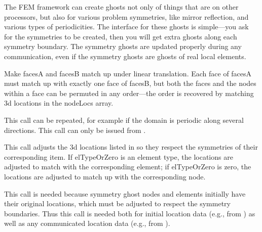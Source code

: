 \documentclass[10pt]{article}
\begin{document}
The FEM framework can create ghosts not only of things that are on other 
processors, but also for various problem symmetries, like mirror reflection,
and various types of periodicities.  The interface for these ghosts is 
simple---you ask for the symmetries to be created, then you will get 
extra ghosts along each symmetry boundary.  The symmetry ghosts are
updated properly during any communication, even if the symmetry ghosts
are ghosts of real local elements.



Make facesA and facesB match up under linear translation.
Each face of facesA must match up with exactly one face of
facesB, but both the faces and the nodes within a face can be
permuted in any order---the order is recovered by matching 3d locations
in the nodeLocs array.

This call can be repeated, for example if the domain is periodic along several
directions.  This call can only be issued from .




This call adjusts the 3d locations listed in  so they respect the symmetries
of their corresponding item.  If elTypeOrZero is an element type,
the locations are adjusted to match with the corresponding element;
if elTypeOrZero is zero, the locations are adjusted to match up with
the corresponding node.

This call is needed because symmetry ghost nodes and elements
initially have their original locations, which must be adjusted
to respect the symmetry boundaries.  Thus this call is needed
both for initial location data (e.g., from )
as well as any communicated location data (e.g., from
).
\end{document}
